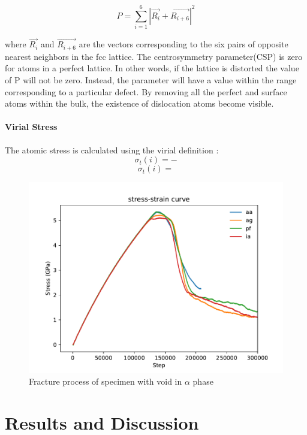 \documentclass[final,5p,times,onecolumn]{elsarticle}
\begin{document}
\begin{equation} \label{eq:csp} 
	P = \displaystyle\sum_{i=1}^{6}|\vec{R_i}+\vec{R_{i+6}}|^2
\end{equation}

where $\vec{R_i}$ and $\vec{R_{i+6}}$ are the vectors corresponding to the six pairs of opposite nearest neighbors in the fcc lattice. The centrosymmetry parameter(CSP) is zero for atoms in a perfect lattice. In other words, if the lattice is distorted the value of P will not be zero. Instead, the parameter will have a value within the range corresponding to a particular defect. By removing all the perfect and surface atoms within the bulk, the existence of dislocation atoms become visible.
	
\paragraph{Virial Stress}
The atomic stress is calculated using the virial definition :
$$\sigma_t(i)=-$$
$$\sigma_t(i)= $$
 


\begin{figure}
	\centering
	\includegraphics[width=1\linewidth]{img/allline}
	\caption{Fracture process of specimen with void in $\alpha$ phase}
	\label{fig:all_line}
\end{figure}

\section{Results and Discussion}
\end{document}

